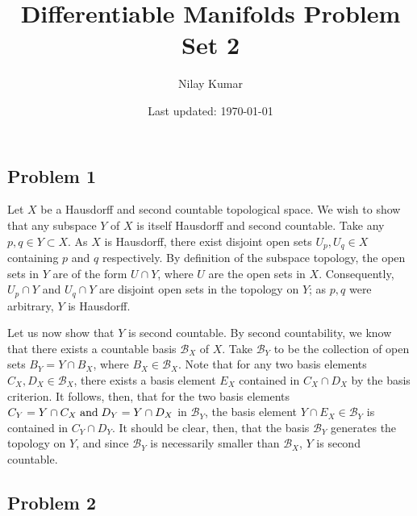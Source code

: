 \documentclass{../../mathnotes}
\title{Differentiable Manifolds Problem Set 2}
\author{Nilay Kumar}
\date{Last updated: \today}
\begin{document}
\maketitle

\subsection*{Problem 1}

Let $X$ be a Hausdorff and second countable topological space. We wish to show that any subspace $Y$ of $X$ is itself Hausdorff
and second countable. Take any $p,q\in Y\subset X$. As $X$ is Hausdorff, there exist disjoint open sets $U_p, U_q\in X$ containing $p$ and $q$
respectively. By definition of the subspace topology, the open sets in $Y$ are of the form $U\cap Y$, where $U$ are the open sets in $X$.
Consequently, $U_p\cap Y$ and $U_q\cap Y$ are disjoint open sets in the topology on $Y$; as $p,q$ were arbitrary, $Y$ is Hausdorff.

Let us now show that $Y$ is second countable. By second countability, we know that there exists a countable basis $\mathcal{B}_X$ of $X$.
Take $\mathcal{B}_Y$ to be the collection of open sets $B_Y=Y\cap B_X$, where $B_X\in\mathcal{B}_X$. 
Note that for any two basis elements $C_X, D_X\in\mathcal{B}_X$, there exists a basis element $E_X$ contained in $C_X\cap D_X$ by the basis
criterion. It follows, then, that for the two basis elements
$C_Y=Y\cap C_X \;\textnormal{and}\; D_Y=Y\cap D_X$ in $\mathcal{B}_Y$, the basis element $Y\cap E_X\in \mathcal{B}_Y$ is contained in $C_Y\cap D_Y$.
It should be clear, then, that the basis $\mathcal{B}_Y$ generates the topology on $Y$, and since $\mathcal{B}_Y$ is necessarily smaller
than $\mathcal{B}_X$, $Y$ is second countable.

\subsection*{Problem 2}
\end{document}

